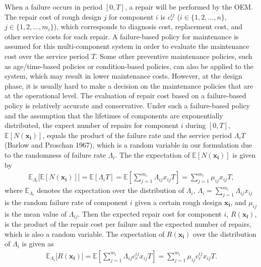 \documentclass[10pt,a4paper]{article}
\begin{document}
When a failure occurs in period $[0, T]$, a repair will be performed by the OEM. The repair cost of rough design $j$ for component $i$ is $c_r^{ij}$ ($i \in \{1,2,...,n\}$, $j \in \{1,2,...,m_i\}$), which corresponds to diagnosis cost, replacement cost, and other service costs for each repair. A failure-based policy for maintenance is assumed for this multi-component system in order to evaluate the maintenance cost over the service period $T$. Some other preventive maintenance policies, such as age/time-based policies or condition-based policies, can also be applied to the system, which may result in lower maintenance costs. However, at the design phase, it is usually hard to make a decision on the maintenance policies that are at the operational level. The evaluation of repair cost based on a failure-based policy is relatively accurate and conservative. Under such a failure-based policy and the assumption that the lifetimes of components are exponentially distributed, the expect number of repairs for component $i$ during $[0,T]$, $\mathbb{E}[N(\boldsymbol{x_{i}})]$, equals the product of the failure rate and the service period $\Lambda_i T$ (Barlow and Proschan 1967), which is a random variable in our formulation due to the randomness of failure rate $\Lambda_i$. The the expectation of $\mathbb{E}[N(\boldsymbol{x_{i}})]$ is given by
\begin {eqnarray}
\mathbb{E}_{\Lambda_i} \bigg[ \mathbb{E}[N(\boldsymbol{x_{i}})] \bigg]=\mathbb{E}[\Lambda_i T]=\mathbb{E}[\sum_{j=1}^{m_{i}}{\Lambda_{ij}x_{ij}}T]=\sum_{j=1}^{m_{i}}{\mu_{ij}x_{ij}}T,
\end {eqnarray}
where $\mathbb{E}_{\Lambda_i}$ denotes the expectation over the distribution of $\Lambda_i$, $\Lambda_{i}=\sum_{j=1}^{m_{i}}{\Lambda_{ij}x_{ij}}$ is the random failure rate of component $i$ given a certain rough design $\boldsymbol{x_i}$, and $\mu_{ij}$ is the mean value of $\Lambda_{ij}$. Then the expected repair cost for component $i$, $R(\boldsymbol{x_{i}})$, is the product of the repair cost per failure and the expected number of repairs, which is also a random variable. The expectation of $R(\boldsymbol{x_{i}})$ over the distribution of $\Lambda_i$ is given as
\begin {eqnarray}
\mathbb{E}_{\Lambda_i} \bigg[ R(\boldsymbol{x_{i}}) \bigg]=\mathbb{E}[\sum_{j=1}^{m_{i}}{\Lambda_{ij}c_r^{ij}x_{ij}}T]= \sum_{j=1}^{m_{i}}{\mu_{ij}c_r^{ij}x_{ij}}T.
\end {eqnarray}
\end{document}
